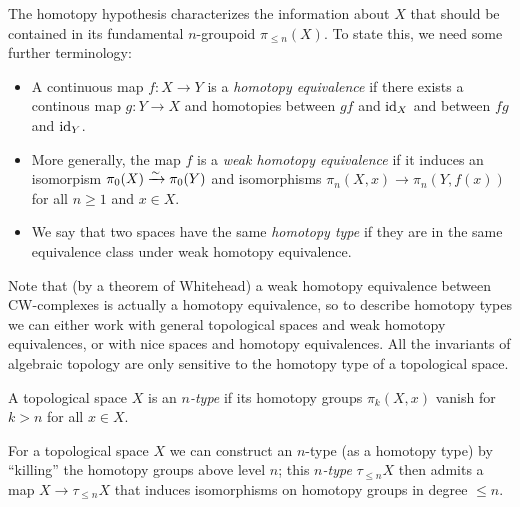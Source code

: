 \documentclass[a4paper,11pt]{article}
\begin{document}
The homotopy hypothesis characterizes the information about $X$ that
should be contained in its fundamental $n$-groupoid $\pi_{\leq
  n}(X)$. To state this, we need some further terminology:
\begin{itemize}
\item A continuous map $f \colon X \to Y$ is a \emph{homotopy
    equivalence} if there exists a continous map $g \colon Y \to X$
  and homotopies between $gf$ and $\text{\textup{id}}_{X}$ and between $fg$ and
  $\text{\textup{id}}_{Y}$.
\item More generally, the map $f$ is a \emph{weak
  homotopy equivalence} if it induces an isomorpism
$\pi_{0}(X) \isoto \pi_{0}(Y)$ and isomorphisms
$\pi_{n}(X,x) \to \pi_{n}(Y,f(x))$ for all $n \geq 1$ and $x \in
X$.
\item We say that two spaces have the same \emph{homotopy type} if
  they are in the same equivalence class under weak homotopy
  equivalence.
\end{itemize}
Note that (by a theorem of Whitehead) a weak homotopy equivalence
between CW-complexes is actually a homotopy equivalence, so to
describe homotopy types we can either work with general topological
spaces and weak homotopy equivalences, or with nice spaces and
homotopy equivalences. All the invariants of algebraic topology are
only sensitive to the homotopy type of a topological space.

\begin{defn}
  A topological space $X$ is an \emph{$n$-type} if its homotopy groups
  $\pi_{k}(X,x)$ vanish for $k > n$ for all $x \in X$.
\end{defn}

For a topological space $X$ we can construct an $n$-type (as a
homotopy type) by ``killing'' the homotopy groups above level $n$;
this \emph{$n$-type} $\tau_{\leq n}X$ then admits a map
$X \to \tau_{\leq n}X$ that induces isomorphisms on homotopy groups in
degree $\leq n$.
\end{document}
